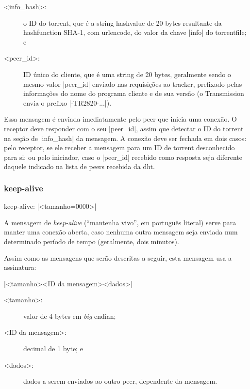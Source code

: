\begin{description}
    \item[<info_hash>:] o ID do \gls*{torrent}, que é a \gls*{string}
        \gls*{hashvalue} de 20 bytes resultante da \gls*{hashfunction} SHA-1, com
        \gls*{urlencode}, do valor da chave \bverb|info| do \gls*{torrentfile}; e

    \item[<peer_id>:] ID único do cliente, que é uma \gls*{string} de 20 bytes,
        geralmente sendo o mesmo valor \bverb|peer_id| enviado nas requisições ao
        \gls*{tracker}, prefixado pelas informações do nome do programa cliente e de sua
        versão (o Transmission envia o prefixo \sverb|-TR2820-...|).
\end{description}


Essa mensagem é enviada imediatamente pelo \gls*{peer} que inicia uma conexão. O
receptor deve responder com o seu \bverb|peer_id|, assim que detectar o ID do
\gls*{torrent} na seção de \bverb|info_hash| da mensagem. A conexão deve ser fechada em
dois casos: pelo receptor, se ele receber a mensagem para um ID de \gls*{torrent}
desconhecido para si; ou pelo iniciador, caso o \bverb|peer_id| recebido como resposta
seja diferente daquele indicado na lista de \glspl*{peer} recebida da \gls*{dht}.

\subsubsection*{keep-alive}

keep-alive: \bverb|<tamanho=0000>|

A mensagem de \emph{keep-alive} (``mantenha vivo'', em português literal) serve para
manter uma conexão aberta, caso nenhuma outra mensagem seja enviada num determinado
período de tempo (geralmente, dois minutos).

Assim como as mensagens que serão descritas a seguir, esta mensagem usa a assinatura:

\bverb|<tamanho><ID da mensagem><dados>|

\begin{description}
    \item[<tamanho>:] valor de 4 bytes em \emph{big} \gls{endian};

    \item[<ID da mensagem>:] decimal de 1 byte; e

    \item[<dados>:] dados a serem enviados ao outro \gls*{peer}, dependente da
        mensagem.
\end{description}

